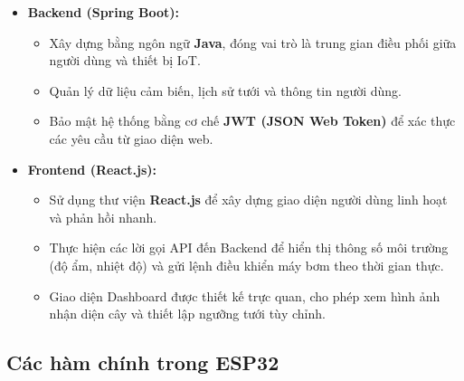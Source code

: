 \documentclass[12pt,a4paper]{report}
\begin{document}
\begin{itemize}
    \item \textbf{Backend (Spring Boot):} 
    \begin{itemize}
        \item Xây dựng bằng ngôn ngữ \textbf{Java}, đóng vai trò là trung gian điều phối giữa người dùng và thiết bị IoT.
        \item Quản lý dữ liệu cảm biến, lịch sử tưới và thông tin người dùng.
        \item Bảo mật hệ thống bằng cơ chế \textbf{JWT (JSON Web Token)} để xác thực các yêu cầu từ giao diện web.
    \end{itemize}
    \item \textbf{Frontend (React.js):}
    \begin{itemize}
        \item Sử dụng thư viện \textbf{React.js} để xây dựng giao diện người dùng linh hoạt và phản hồi nhanh.
        \item Thực hiện các lời gọi API đến Backend để hiển thị thông số môi trường (độ ẩm, nhiệt độ) và gửi lệnh điều khiển máy bơm theo thời gian thực.
        \item Giao diện Dashboard được thiết kế trực quan, cho phép xem hình ảnh nhận diện cây và thiết lập ngưỡng tưới tùy chỉnh.
    \end{itemize}
\end{itemize}

\subsection{Các hàm chính trong ESP32}
\end{document}
